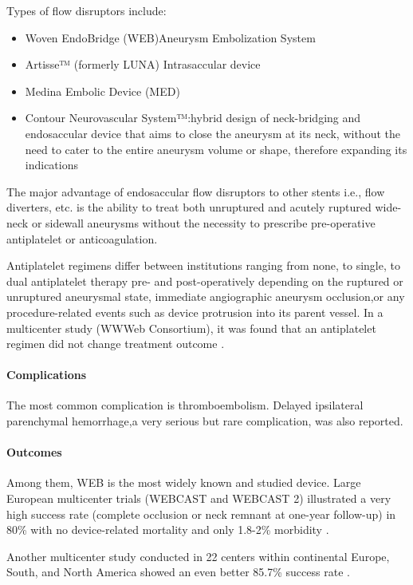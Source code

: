 Types of flow disruptors include:

\begin{itemize}
	\item
	Woven EndoBridge (WEB)Aneurysm Embolization System
	\item
	Artisse™ (formerly LUNA) Intrasaccular device
	\item
	Medina Embolic Device (MED)
	\item
	Contour Neurovascular System™:hybrid design of neck-bridging and endosaccular device that aims to close the aneurysm at its neck, without the need to cater to the entire aneurysm volume or shape, therefore expanding its indications
\end{itemize}

The major advantage of endosaccular flow disruptors to other stents i.e., flow diverters, etc. is the ability to treat both unruptured and acutely ruptured wide-neck or sidewall aneurysms without the necessity to prescribe pre-operative antiplatelet or anticoagulation.

Antiplatelet regimens differ between institutions ranging from none, to single, to dual antiplatelet therapy pre- and post-operatively depending on the ruptured or unruptured aneurysmal state, immediate angiographic aneurysm occlusion,or any procedure-related events such as device protrusion into its parent vessel. In a multicenter study (WWWeb Consortium), it was found that an antiplatelet regimen did not change treatment outcome .

\paragraph{Complications}

The most common complication is thromboembolism. Delayed ipsilateral parenchymal hemorrhage,a very serious but rare complication, was also reported.

\paragraph{Outcomes}

Among them, WEB is the most widely known and studied device. Large European multicenter trials (WEBCAST and WEBCAST 2) illustrated a very high success rate (complete occlusion or neck remnant at one-year follow-up) in 80\% with no device-related mortality and only 1.8-2\% morbidity .

Another multicenter study conducted in 22 centers within continental Europe, South, and North America showed an even better 85.7\% success rate .

